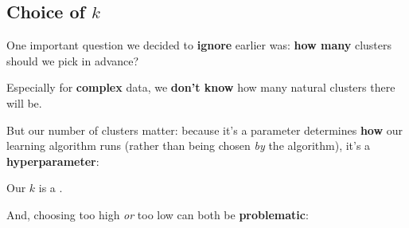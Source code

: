     \subsection*{Choice of $k$}
    
        One important question we decided to \textbf{ignore} earlier was: \textbf{how many} clusters should we pick in advance?
        
        Especially for \textbf{complex} data, we \textbf{don't know} how many natural clusters there will be. 
        
        But our number of clusters matter: because it's a parameter determines \textbf{how} our learning algorithm runs (rather than being chosen \textit{by} the algorithm), it's a \textbf{hyperparameter}:\\
        
        \begin{concept}
            Our  $k$ is a .
        \end{concept}
        
        And, choosing too high \textit{or} too low can both be \textbf{problematic}:
        
